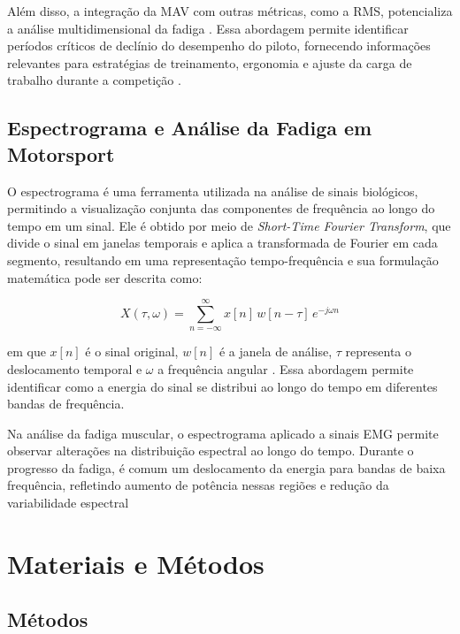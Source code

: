 \documentclass[symbols]{fei}
\begin{document}
Além disso, a integração da MAV com outras métricas, como a RMS, potencializa a análise multidimensional da fadiga \cite{merletti2004electromyography}. Essa abordagem permite 
identificar períodos críticos de declínio do desempenho do piloto, 
fornecendo informações relevantes para estratégias de treinamento, ergonomia e ajuste da carga de trabalho durante a competição \cite{phinyomark2012feature,deluca1997use}.

\subsection{Espectrograma e Análise da Fadiga em Motorsport}

O espectrograma é uma ferramenta utilizada na análise de sinais biológicos, permitindo a visualização conjunta das 
componentes de frequência ao longo do tempo em um sinal. Ele é obtido por meio de \textit{Short-Time Fourier Transform}, que divide o sinal em 
janelas temporais e aplica a transformada de Fourier em cada segmento, resultando em uma representação tempo-frequência e sua formulação matemática pode ser descrita como:

\begin{equation}
X(\tau, \omega) = \sum_{n=-\infty}^{\infty} x[n] \, w[n - \tau] \, e^{-j \omega n}
\end{equation}

em que \(x[n]\) é o sinal original, \(w[n]\) é a janela de análise, \(\tau\) representa o deslocamento temporal e \(\omega\) a 
frequência angular \cite{allen1977short}. Essa abordagem permite identificar como a energia do sinal se distribui ao longo do tempo 
em diferentes bandas de frequência.

Na análise da fadiga muscular, o espectrograma aplicado a sinais EMG permite observar alterações na distribuição espectral ao longo do tempo. Durante o progresso da fadiga, 
é comum um deslocamento da energia para bandas de baixa frequência, refletindo aumento de potência nessas regiões e redução da variabilidade 
espectral \cite{puce2021_spectral, rodrigues2022_emg_processing}
   

\section{Materiais e Métodos}
\subsection{Métodos}
\end{document}
